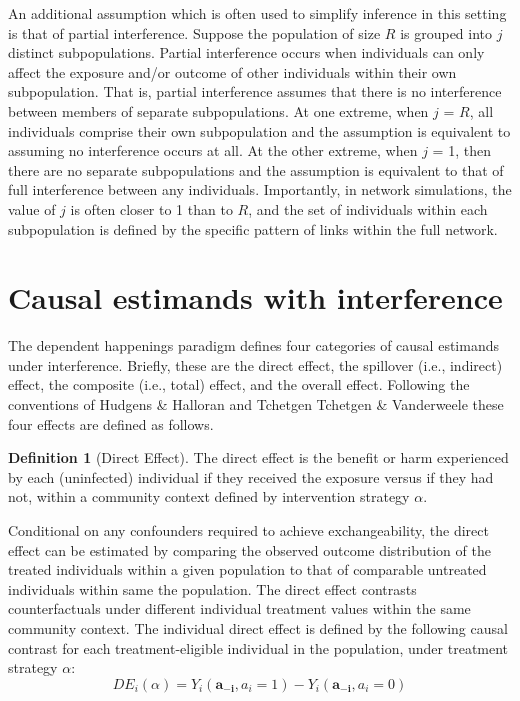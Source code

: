 \documentclass{article}
\theoremstyle{definition}
\newtheorem{definition}{Definition}[section]
\begin{document}
An additional assumption which is often used to simplify inference in this setting is that of partial interference. Suppose the population of size $R$ is grouped into $j$ distinct subpopulations. Partial interference occurs when individuals can only affect the exposure and/or outcome of other individuals within their own subpopulation. That is, partial interference assumes that there is no interference between members of separate subpopulations. At one extreme, when $j$ = $R$, all individuals comprise their own subpopulation and the assumption is equivalent to assuming no interference occurs at all. At the other extreme, when $j$ = 1, then there are no separate subpopulations and the assumption is equivalent to that of full interference between any individuals. Importantly, in network simulations, the value of $j$ is often closer to 1 than to $R$, and the set of individuals within each subpopulation is defined by the specific pattern of links within the full network.


\section{Causal estimands with interference}
The dependent happenings paradigm defines four categories of causal estimands under interference. Briefly, these are the direct effect, the spillover (i.e., indirect) effect, the composite (i.e., total) effect, and the overall effect. Following the conventions of Hudgens \& Halloran \cite{hudgens_toward_2008} and Tchetgen Tchetgen \& Vanderweele \cite{tchetgen_tchetgen_causal_2012} these four effects are defined as follows. 

\begin{definition}[Direct Effect]The direct effect is the benefit or harm experienced by each (uninfected) individual if they received the exposure versus if they had not, within a community context defined by intervention strategy $\alpha$. 
\end{definition}
Conditional on any confounders required to achieve exchangeability, the direct effect can be estimated by comparing the observed outcome distribution of the treated individuals within a given population to that of comparable untreated individuals within same the population. The direct effect contrasts counterfactuals under different individual treatment values within the same community context. The individual direct effect is defined by the following causal contrast for each treatment-eligible individual in the population, under treatment strategy $\alpha$:
\begin{equation}\label{eq:1}
   DE_{i}\left(\alpha\right) = Y_{i}\left(\mathbf{a_{-i}}, a_{i} = 1\right) - Y_{i}\left(\mathbf{a_{-i}}, a_{i} = 0\right)	
\end{equation}
	
\end{document}
